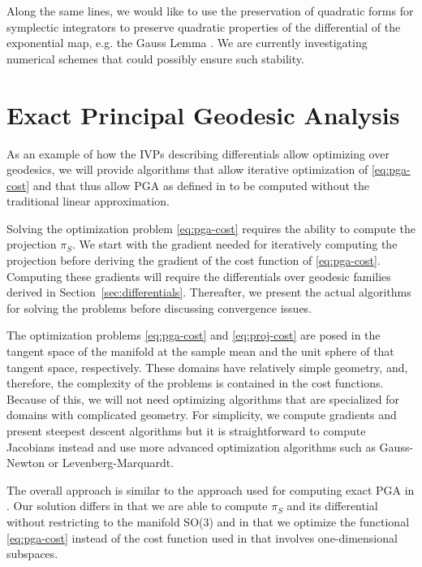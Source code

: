 \documentclass[final]{svjour3}
\begin{document}
Along the same lines, we would like to use the preservation of quadratic
forms for symplectic integrators \cite{hairer_geometric_2002} to preserve
quadratic properties of the differential of the exponential map, e.g. the Gauss
Lemma \cite{do_carmo_riemannian_1992}. We are currently
investigating numerical schemes that could possibly ensure such stability.

\section{Exact Principal Geodesic Analysis}
\label{sec:pga}
As an example of how the IVPs describing differentials allow
optimizing over geodesics, we will provide algorithms that allow iterative
optimization of \eqref{eq:pga-cost} and that thus allow PGA as defined in
\cite{fletcher_principal_2004-1} to be computed without the traditional linear 
approximation.

Solving the optimization problem \eqref{eq:pga-cost} 
requires the ability to compute the projection $\pi_S$.
We start with the gradient needed for iteratively computing the projection before deriving
the gradient of the cost function of 
\eqref{eq:pga-cost}. Computing these gradients will
require the differentials over geodesic families
derived in Section~\ref{sec:differentials}.
Thereafter, we present the actual algorithms for solving the problems before
discussing convergence issues.

The optimization problems \eqref{eq:pga-cost} and \eqref{eq:proj-cost} are posed
in the tangent space of the manifold at the sample mean and the unit sphere
of that tangent space, respectively. These domains have relatively simple
geometry, and, therefore, the complexity of the problems is contained in the
cost functions. Because of this, we will not need optimizing
algorithms that are specialized for domains with complicated geometry.
For simplicity, we compute
gradients and present steepest descent algorithms but it is straightforward to
compute Jacobians instead and use more advanced optimization algorithms such as
Gauss-Newton or Levenberg-Marquardt.

The overall approach is similar 
to the approach used for computing exact PGA in \cite{said_exact_2007}. Our solution differs in that we are
able to compute $\pi_S$ and its differential without restricting to
the manifold SO(3) and in that we optimize the functional \eqref{eq:pga-cost} instead of
the cost function used in \cite{fletcher_statistics_2003} that involves one-dimensional 
subspaces.
\end{document}
